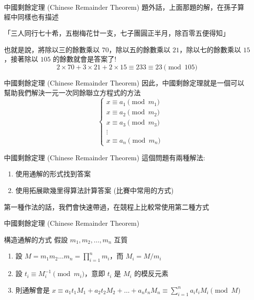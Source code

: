 \documentclass[aspectratio=169]{beamer}
\begin{document}
\begin{frame}{中國剩餘定理 (Chinese Remainder Theorem)}
    題外話，上面那題的解，在孫子算經中同樣也有描述
    \begin{center}
        「三人同行七十希，五樹梅花廿一支，七子團圓正半月，除百零五便得知」
    \end{center}
    也就是說，將除以三的餘數乘以 $70$，除以五的餘數乘以 $21$，除以七的餘數乘以 $15$，接著除以 $105$ 的餘數就會是答案了! \\
    $$2 \times 70 + 3 \times 21 + 2 \times 15 \equiv 233 \equiv 23 \pmod {105}$$
\end{frame}

\begin{frame}{中國剩餘定理 (Chinese Remainder Theorem)}
    因此，中國剩餘定理就是一個可以幫助我們解決一元一次同餘聯立方程式的方法
    \begin{equation*}
        \quad \left\{ \begin{matrix} x \equiv a_1 \pmod {m_1} \\ x \equiv a_2 \pmod {m_2} \\ x \equiv a_3 \pmod {m_3} \\ \vdots \\ x \equiv a_n \pmod {m_n} \end{matrix} \right.
    \end{equation*}
\end{frame}

\begin{frame}{中國剩餘定理 (Chinese Remainder Theorem)}
    這個問題有兩種解法:
    \begin{enumerate}
        \item 使用通解的形式找到答案
        \item 使用拓展歐幾里得算法計算答案 (比賽中常用的方式)
    \end{enumerate}
    第一種作法的話，我們會快速帶過，在競程上比較常使用第二種方式
\end{frame}

\begin{frame}{中國剩餘定理 (Chinese Remainder Theorem)}
    \begin{alertblock}{構造通解的方式}
        假設 $m_1, m_2, \dots, m_n$ 互質
        \begin{enumerate}
            \item 設 $M = m_1 m_2 \dots m_n = \prod_{i=1}^n m_i$，而 $M_i = M/m_i$
            \item 設 $t_i \equiv M_i^{-1} \pmod m_i$，意即 $t_i$ 是 $M_i$ 的模反元素  
            \item 則通解會是 $x \equiv a_1t_1M_1 + a_2t_2M_2 + \dots + a_n t_n M_n \equiv \sum_{i=1}^n a_i t_i M_i \pmod M$
        \end{enumerate}
    \end{alertblock}
\end{frame}
\end{document}
